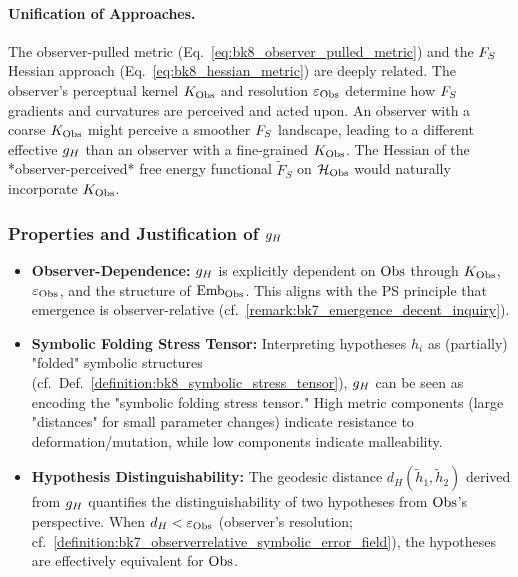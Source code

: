\paragraph{Unification of Approaches.}
The observer-pulled metric (Eq.~\eqref{eq:bk8_observer_pulled_metric}) and the \(F_S\) Hessian approach (Eq.~\eqref{eq:bk8_hessian_metric}) are deeply related. The observer's perceptual kernel \(K_{\mathrm{Obs}}\) and resolution \(\varepsilon_{\mathrm{Obs}}\) determine how \(F_S\) gradients and curvatures are perceived and acted upon. An observer with a coarse \(K_{\mathrm{Obs}}\) might perceive a smoother \(F_S\) landscape, leading to a different effective \(g_H\) than an observer with a fine-grained \(K_{\mathrm{Obs}}\). The Hessian of the *observer-perceived* free energy functional \(\tilde{F}_S\) on \(\mathcal{H}_{\mathrm{Obs}}\) would naturally incorporate \(K_{\mathrm{Obs}}\).
\subsubsection{Properties and Justification of \(g_H\)}
\label{subsec:bk8_properties_and_justification_of_observer_dependence}
\begin{itemize}
    \item \textbf{Observer-Dependence:} \(g_H\) is explicitly dependent on \(\mathrm{Obs}\) through \(K_{\mathrm{Obs}}\), \(\varepsilon_{\mathrm{Obs}}\), and the structure of \(\text{Emb}_{\mathrm{Obs}}\). This aligns with the PS principle that emergence is observer-relative (cf.~\ref{remark:bk7_emergence_decent_inquiry}).
    \item \textbf{Symbolic Folding Stress Tensor:} Interpreting hypotheses \(h_i\) as (partially) "folded" symbolic structures (cf.~Def.~\ref{definition:bk8_symbolic_stress_tensor}), \(g_H\) can be seen as encoding the "symbolic folding stress tensor." High metric components (large "distances" for small parameter changes) indicate resistance to deformation/mutation, while low components indicate malleability.
    \item \textbf{Hypothesis Distinguishability:} The geodesic distance \(d_H(\tilde{h}_1, \tilde{h}_2)\) derived from \(g_H\) quantifies the distinguishability of two hypotheses from \(\mathrm{Obs}\)'s perspective. When \(d_H < \varepsilon_{\mathrm{Obs}}\) (observer's resolution; cf.~\ref{definition:bk7_observerrelative_symbolic_error_field}), the hypotheses are effectively equivalent for \(\mathrm{Obs}\).
\end{itemize}
